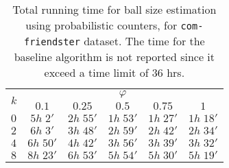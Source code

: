 \begin{table}[ht]
    \centering
    \caption{Total running time for ball size estimation using probabilistic counters, for \texttt{com-friendster} dataset. The time for the baseline algorithm is not reported since it exceed a time limit of $36$ hrs.}
    \begin{tabular}{l|ccccc}
    \toprule
        \multirow{2}{*}{$k$} & \multicolumn{5}{c}{$\varphi$} \\
        & $0.1$ & $0.25$ & $0.5$ & $0.75$ & $1$\\
    \midrule

    $0$ & $5h\; 2'$ & $2h\; 55'$ & $1h\; 53'$ & $1h\; 27'$ & $1h\; 18'$ \\
    $2$ & $6h\; 3'$ & $3h\; 48'$ & $2h\; 59'$ & $2h\; 42'$ & $2h\; 34'$ \\
    $4$ & $6h\; 50'$ & $4h\; 42'$ & $3h\; 56'$ & $3h\; 39'$ & $3h\; 32'$ \\
    $8$ & $8h\; 23'$ & $6h\; 53'$ & $5h\; 54'$ & $5h\; 30'$ & $5h\; 19'$ \\
    
    \bottomrule

    \end{tabular}
    \label{tab:size-time-friendster}
\end{table}

